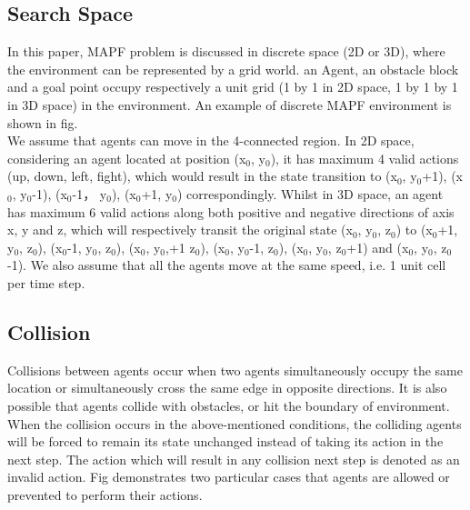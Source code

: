 \documentclass[sigconf,authordraft, nonacm=true]{acmart}
\begin{document}
\subsection{Search Space}
In this paper, MAPF problem is discussed in discrete space (2D or 3D), where the environment can be represented by a grid world. an Agent, an obstacle block and a goal point occupy respectively a unit grid (1 by 1 in 2D space, 1 by 1 by 1 in 3D space) in the environment. An example of discrete MAPF environment is shown in fig.  
\\We assume that agents can move in the 4-connected region. In 2D space, considering an agent located at position (x${_0}$, y${_0}$), it has maximum 4 valid actions (up, down, left, fight), which would result in the state transition to (x${_0}$, y${_0}$+1), (x${_0}$, y${_0}$-1), (x${_0}$-1， y${_0}$), (x${_0}$+1, y${_0}$) correspondingly. Whilst in 3D space, an agent has maximum 6 valid actions along both positive and negative directions of axis x, y and z, which will respectively transit the original state (x${_0}$, y${_0}$, z${_0}$) to (x${_0}$+1, y${_0}$, z${_0}$), (x${_0}$-1, y${_0}$, z${_0}$), (x${_0}$, y${_0}$,+1 z${_0}$), (x${_0}$, y${_0}$-1, z${_0}$), (x${_0}$, y${_0}$, z${_0}$+1) and  (x${_0}$, y${_0}$, z${_0}$-1). We also assume that all the agents move at the same speed, i.e. 1 unit cell per time step.  

\subsection{Collision}  
Collisions between agents occur when two agents simultaneously occupy the same location or simultaneously cross the same edge in opposite directions. It is also possible that agents collide with obstacles, or hit the boundary of environment. When the collision occurs in the above-mentioned conditions, the colliding agents will be forced to remain its state unchanged instead of taking its action in the next step. The action which will result in any collision next step is denoted as an invalid action. Fig demonstrates two particular cases that agents are allowed or prevented to perform their actions.
\end{document}
